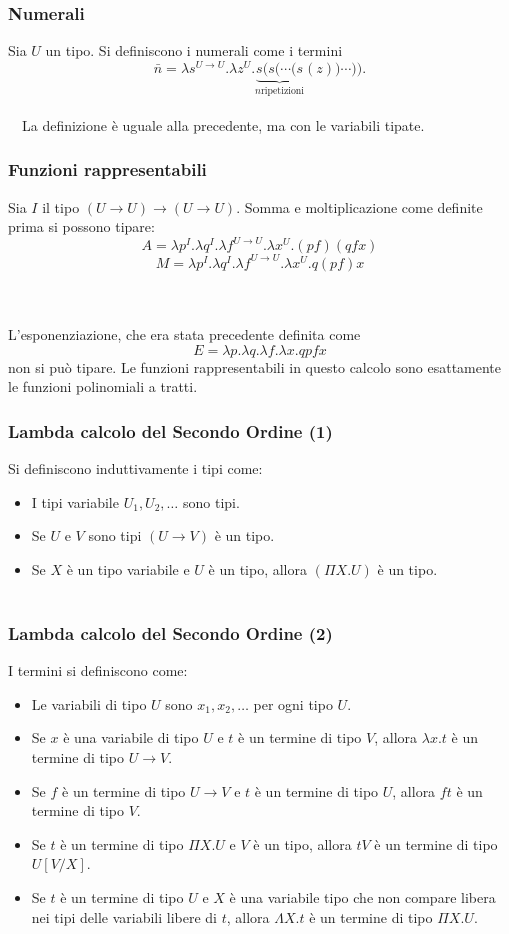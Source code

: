 \documentclass[aspectratio=43]{beamer}
\renewcommand{\l}{\lambda}
\renewcommand{\L}{\Lambda}
\newcommand{\ar}{\rightarrow}
\begin{document}
\begin{frame}
    \frametitle{Numerali}
    Sia $U$ un tipo. Si definiscono i numerali come i termini
    \[
        \bar{n} = \l s^{U\ar U}. \l z^{U}. \underbrace{s ( s ( \cdots (s}_{n\text{
            ripetizioni}} (z))\cdots )).
    \]
    \\~\
    La definizione \`e uguale alla precedente, ma con le variabili tipate.
\end{frame}


\begin{frame}
    \frametitle{Funzioni rappresentabili}

    Sia $I$ il tipo $(U\ar U)\ar (U\ar U)$.
    Somma e moltiplicazione come definite prima si possono tipare:
    \[
        A = \l p^I. \l q^I. \l f^{U\ar U}. \l x^U. (pf)(qfx)
    \]
    \[
            M = \l p^I. \l q^I. \l f^{U\ar U}. \l x^U. q(pf)x
    \]
    \\~\
    
    L'esponenziazione, che era stata precedente definita come
    \[
        E = \l p. \l q. \l f. \l x. qpfx
    \]
    non si pu\`o tipare. Le funzioni rappresentabili in questo calcolo sono
    esattamente le funzioni polinomiali a tratti.
\end{frame}

\begin{frame} 
    \frametitle{Lambda calcolo del Secondo Ordine (1)}
    Si definiscono induttivamente i tipi come:
    \begin{itemize}
        \item I tipi variabile $U_1, U_2, \dots$ sono tipi.
        \item Se $U$ e $V$ sono tipi $(U\ar V)$ \`e un tipo.
        \item Se $X$ \`e un tipo variabile e $U$ \`e un tipo, allora $(\Pi X.U)$
            \`e un tipo.
    \\~\
    \end{itemize}
\end{frame} 

\begin{frame} 
    \frametitle{Lambda calcolo del Secondo Ordine (2)}
    I termini si definiscono come:
    \begin{itemize}
        \item Le variabili di tipo $U$ sono $x_1, x_2, \dots$ per ogni tipo $U$.
        \item Se $x$ \`e una variabile di tipo $U$ e $t$ \`e un termine di tipo
            $V$, allora $\l x. t$ \`e un termine di tipo $U\ar V$.
        \item Se $f$ \`e un termine di tipo $U\ar V$ e $t$ \`e un termine di
            tipo $U$, allora $ft$ \`e un termine di tipo $V$.
        \item Se $t$ \`e un termine di tipo $\Pi X. U$ e $V$ \`e un tipo, allora
            $tV$ \`e un termine di tipo $U[V/X]$.
        \item Se $t$ \`e un termine di tipo $U$ e $X$ \`e una variabile tipo che
            non compare libera nei tipi delle variabili libere di $t$, allora
            $\L X. t$ \`e un termine di tipo $\Pi X. U$.
    \end{itemize}
\end{frame} 
\end{document}
